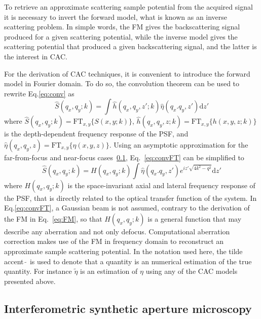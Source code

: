 To retrieve an approximate scattering sample potential from the acquired signal it is necessary to invert the forward model, what is known as an inverse scattering problem. In simple words, the FM gives the backscattering signal produced for a given scattering potential, while the inverse model gives the scattering potential that produced a given backscattering signal, and the latter is the interest in CAC.

For the derivation of CAC techniques, it is convenient to introduce the forward model in Fourier domain. To do so, the convolution theorem can be used to rewrite Eq.\eqref{eq:conv} as
\begin{equation}\label{eq:convFT}
    \hat{S}(q_x, q_y; k) = \int \hat{h}(q_x, q_y, z'; k) \hat{\eta}(q_x. q_y, z') \text{d}z'
\end{equation}
where $\hat{S}(q_x, q_y; k)=\text{FT}_{x,y}\{S(x,y;k)\}$, $\hat{h}(q_x, q_y, z; k)=\text{FT}_{x,y}\{h(x,y,z;k)\}$ is the depth-dependent frequency response of the PSF, and $\hat{\eta}(q_x, q_y, z)=\text{FT}_{x,y}\{\eta(x,y,z)\}$. Using an asymptotic approximation for the far-from-focus and near-focus cases~\ref{}, Eq.~\eqref{eq:convFT} can be simplified to
\begin{equation}\label{eq:FMft}
    \hat{S}(q_x, q_y; k) = H(q_x, q_y; k) \int \hat{\eta}(q_x. q_y, z') e^{iz'\sqrt{4k^2-q^2}} \text{d}z'
\end{equation}
where $H(q_x, q_y; k)$ is the space-invariant axial and lateral frequency response of the PSF, that is directly related to the optical transfer function of the system. In Eq.\eqref{eq:convFT}, a Gaussian beam is not assumed, contrary to the derivation of the FM in Eq.~\eqref{eq:FM}, so that $H(q_x, q_y; k)$ is a general function that may describe any aberration and not only defocus. Computational aberration correction makes use of the FM in frequency domain to reconstruct an approximate sample scattering potential. In the notation used here, the tilde accent $\tilde{\ }$ is used to denote that a quantity is an numerical estimation of the true quantity. For instance $\tilde{\eta}$ is an estimation of $\eta$ using any of the CAC models presented above.

\subsection{Interferometric synthetic aperture microscopy}

